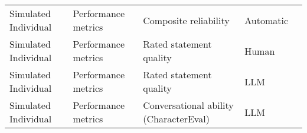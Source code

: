 \begin{small}
\begin{center}
\begin{longtable}{@{}p{}p{}p{}p{}p{}@{}}
Simulated Individual     & Performance metrics                 & Composite reliability                                                                                                                                                                                       & Automatic & \cite{Ke2024HumanAISI}                                                                                                                                                                                                                                                                                                                                                                                           \\
Simulated Individual     & Performance metrics                 & Rated statement quality                                                                                                                                                                                     & Human     & \cite{liu2023improvinginterpersonalcommunicationsimulating}                                                                                                                                                                                                                                                                                                                                                                                              \\
Simulated Individual     & Performance metrics                 & Rated statement quality                                                                                                                                                                                     & LLM       & \cite{liu2023improvinginterpersonalcommunicationsimulating}                                                                                                                                                                                                                                                                                                                                                                                              \\
Simulated Individual     & Performance metrics                 & Conversational ability (CharacterEval)                                                                                                                                                                      & LLM       & \cite{tang2024erabalenhancingroleplayingagents}                                                                                                                                                                                                                                                                                                                                                                                              \\

\end{longtable}
\end{center}
\end{small}
